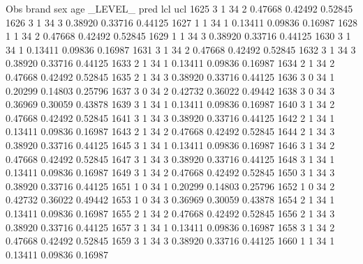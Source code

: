 \documentclass{article}
\begin{document}
\begin{Woutput}
 Obs    brand    sex    age    _LEVEL_      pred       lcl        ucl
1625      3       1      34       2       0.47668    0.42492    0.52845
1626      3       1      34       3       0.38920    0.33716    0.44125
1627      1       1      34       1       0.13411    0.09836    0.16987
1628      1       1      34       2       0.47668    0.42492    0.52845
1629      1       1      34       3       0.38920    0.33716    0.44125
1630      3       1      34       1       0.13411    0.09836    0.16987
1631      3       1      34       2       0.47668    0.42492    0.52845
1632      3       1      34       3       0.38920    0.33716    0.44125
1633      2       1      34       1       0.13411    0.09836    0.16987
1634      2       1      34       2       0.47668    0.42492    0.52845
1635      2       1      34       3       0.38920    0.33716    0.44125
1636      3       0      34       1       0.20299    0.14803    0.25796
1637      3       0      34       2       0.42732    0.36022    0.49442
1638      3       0      34       3       0.36969    0.30059    0.43878
1639      3       1      34       1       0.13411    0.09836    0.16987
1640      3       1      34       2       0.47668    0.42492    0.52845
1641      3       1      34       3       0.38920    0.33716    0.44125
1642      2       1      34       1       0.13411    0.09836    0.16987
1643      2       1      34       2       0.47668    0.42492    0.52845
1644      2       1      34       3       0.38920    0.33716    0.44125
1645      3       1      34       1       0.13411    0.09836    0.16987
1646      3       1      34       2       0.47668    0.42492    0.52845
1647      3       1      34       3       0.38920    0.33716    0.44125
1648      3       1      34       1       0.13411    0.09836    0.16987
1649      3       1      34       2       0.47668    0.42492    0.52845
1650      3       1      34       3       0.38920    0.33716    0.44125
1651      1       0      34       1       0.20299    0.14803    0.25796
1652      1       0      34       2       0.42732    0.36022    0.49442
1653      1       0      34       3       0.36969    0.30059    0.43878
1654      2       1      34       1       0.13411    0.09836    0.16987
1655      2       1      34       2       0.47668    0.42492    0.52845
1656      2       1      34       3       0.38920    0.33716    0.44125
1657      3       1      34       1       0.13411    0.09836    0.16987
1658      3       1      34       2       0.47668    0.42492    0.52845
1659      3       1      34       3       0.38920    0.33716    0.44125
1660      1       1      34       1       0.13411    0.09836    0.16987

\end{Woutput}
\end{document}
